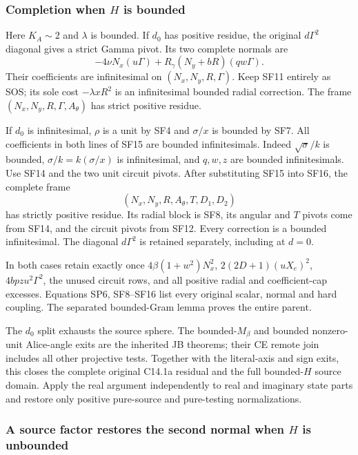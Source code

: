 \subsubsection*{Completion when $H$ is bounded}

Here $K_A\sim2$ and $\lambda$ is bounded. If $d_0$ has positive
residue, the original $d\Gamma^2$ diagonal gives a strict Gamma
pivot. Its two complete normals are
\[
 -4\nu N_x(u\Gamma)
       +R_\gamma(N_y+bR)(qw\Gamma).
 \tag{SF16}
\]
Their coefficients are infinitesimal on $(N_x,N_y,R,\Gamma)$.
Keep SF11 entirely as SOS; its sole cost $-\lambda xR^2$ is an
infinitesimal bounded radial correction. The frame
$(N_x,N_y,R,\Gamma,A_\theta)$ has strict positive residue.

If $d_0$ is infinitesimal, $\rho$ is a unit by SF4 and
$\sigma/x$ is bounded by SF7. All coefficients in both lines of
SF15 are bounded infinitesimals. Indeed $\sqrt\sigma/k$ is
bounded, $\sigma/k=k(\sigma/x)$ is infinitesimal, and $q,w,z$
are bounded infinitesimals. Use SF14 and the two unit circuit
pivots. After substituting SF15 into SF16, the complete frame
\[
 (N_x,N_y,R,A_\theta,T,D_1,D_2)
 \tag{SF17}
\]
has strictly positive residue. Its radial block is SF8, its angular
and $T$ pivots come from SF14, and the circuit pivots from SF12.
Every correction is a bounded infinitesimal. The diagonal
$d\Gamma^2$ is retained separately, including at $d=0$.

In both cases retain exactly once $4\beta(1+w^2)N_x^2$,
$2(2D+1)(uX_e)^2$, $4bpzu^2\Gamma^2$, the unused circuit rows,
and all positive radial and coefficient-cap excesses. Equations
SP6, SF8--SF16 list every original scalar, normal and hard coupling.
The separated bounded-Gram lemma proves the entire parent.

The $d_0$ split exhausts the source sphere. The bounded-$M_\beta$
and bounded nonzero-unit Alice-angle exits are the inherited JB
theorems; their CE remote join includes all other projective tests.
Together with the literal-axis and sign exits, this closes the
complete original C14.1a residual and the full bounded-$H$ source
domain. Apply the real argument independently to real and imaginary
state parts and restore only positive pure-source and pure-testing
normalizations.

\subsubsection*{A source factor restores the second normal when $H$ is unbounded}

